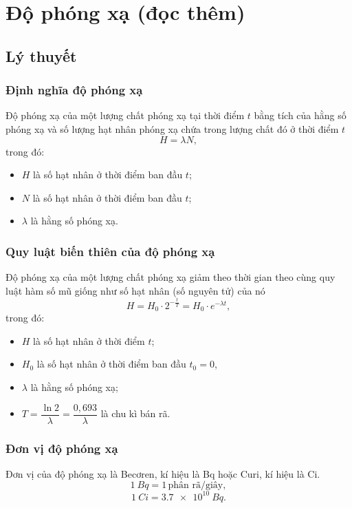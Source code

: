 
\chapter[Độ phóng xạ (đọc thêm)]{Độ phóng xạ (đọc thêm)}
\section{Lý thuyết}

\subsection{Định nghĩa độ phóng xạ}
Độ phóng xạ của một lượng chất phóng xạ tại thời điểm $t$ bằng tích của hằng số phóng xạ và số lượng hạt nhân phóng xạ chứa trong lượng chất đó ở thời điểm $t$
\begin{equation}
	H=\lambda N,
\end{equation}
trong đó:
\begin{itemize}
	\item $H$ là số hạt nhân ở thời điểm ban đầu $t$;
	\item $N$ là số hạt nhân ở thời điểm ban đầu $t$;
	\item $\lambda$ là hằng số phóng xạ.
\end{itemize}

\subsection{Quy luật biến thiên của độ phóng xạ}
Độ phóng xạ của một lượng chất phóng xạ giảm theo thời gian theo cùng quy luật hàm số mũ giống như số hạt nhân (số nguyên tử) của nó
\begin{equation}
	H=H_0\cdot 2^{-\frac{t}{T}}=H_0\cdot e^{-\lambda t},
\end{equation}
trong đó:
\begin{itemize}
	\item $H$ là số hạt nhân ở thời điểm $t$;
	\item $H_0$ là số hạt nhân ở thời điểm ban đầu $t_0=0$,
	\item $\lambda$ là hằng số phóng xạ;
	\item $T=\dfrac{\ln2}{\lambda}=\dfrac{0,693}{\lambda}$ là chu kì bán rã.
\end{itemize}

\subsection{Đơn vị độ phóng xạ}
Đơn vị của độ phóng xạ là Becơren, kí hiệu là Bq hoặc Curi, kí hiệu là Ci.
\begin{equation}
	\SI{1}{Bq}=1\, \text{phân rã/giây},
\end{equation}
\begin{equation}
	\SI{1}{Ci}=\SI{3,7e10}{Bq}.
\end{equation}


